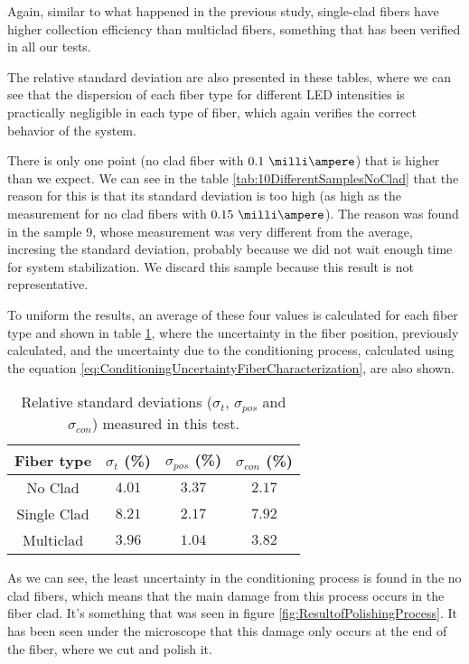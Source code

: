 Again, similar to what happened in the previous study, single-clad fibers have higher collection efficiency than multiclad fibers, something that has been verified in all our tests.

The relative standard deviation are also presented in these tables, where we can see that the dispersion of each fiber type for different LED intensities is practically negligible in each type of fiber, which again verifies the correct behavior of the system. 

There is only one point (no clad fiber with $0.1~\milli\ampere $) that is higher than we expect. We can see in the table \ref{tab:10DifferentSamplesNoClad} that the reason for this is that its standard deviation is too high (as high as the measurement for no clad fibers with $0.15~\milli\ampere$). The reason was found in the sample 9, whose measurement was very different from the average, incresing the standard deviation, probably because we did not wait enough time for system stabilization. We discard this sample because this result is not representative.

To uniform the results, an average of these four values is calculated for each fiber type and shown in table \ref{tab:RelativeStandardDeviations}, where the uncertainty in the fiber position, previously calculated, and the uncertainty due to the conditioning process, calculated using the equation \ref{eq:ConditioningUncertaintyFiberCharacterization}, are also shown. 

\begin{table}[htbp]
\begin{center}
\begin{tabular}{|c|c|c|c|}
\hline
Fiber type & $\sigma_t$ (\%) & $\sigma_{pos}$ (\%) & $\sigma_{con}$ (\%)\\\hline \hline \hline
No Clad & $4.01$ & $3.37$ & $2.17$ \\ \hline
Single Clad & $8.21$ & $2.17$ & $7.92$ \\ \hline
Multiclad & $3.96$ & $1.04$ & $3.82$ \\ \hline
\end{tabular}
\caption{Relative standard deviations ($\sigma_t$, $\sigma_{pos}$ and $\sigma_{con}$) measured in this test.}
\label{tab:RelativeStandardDeviations}
\end{center}
\end{table}

As we can see, the least uncertainty in the conditioning process is found in the no clad fibers, which means that the main damage from this process occurs in the fiber clad. It's something that was seen in figure \ref{fig:ResultofPolishingProcess}. It has been seen under the microscope that this damage only occurs at the end of the fiber, where we cut and polish it.

